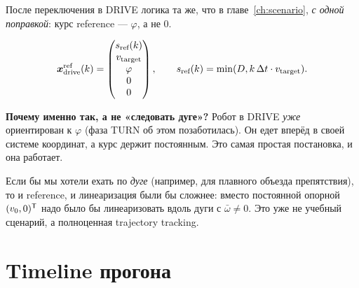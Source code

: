После переключения в DRIVE логика та же, что в главе~\ref{ch:scenario},
\emph{с одной поправкой}: курс reference --- $\varphi$, а не $0$.

\[
  \bm{x}^\text{ref}_\text{drive}(k) =
  \begin{pmatrix} s_\text{ref}(k)\\ v_\text{target}\\ \varphi\\ 0\\ 0 \end{pmatrix},
  \qquad
  s_\text{ref}(k) = \min(D, k\,\Delta t \cdot v_\text{target}).
\]

\begin{ideabox}
\textbf{Почему именно так, а не «следовать дуге»?} Робот в DRIVE
\emph{уже} ориентирован к $\varphi$ (фаза TURN об этом позаботилась).
Он едет вперёд в своей системе координат, а курс держит постоянным.
Это самая простая постановка, и она работает.

Если бы мы хотели ехать по \emph{дуге} (например, для плавного объезда
препятствия), то и reference, и линеаризация были бы сложнее: вместо
постоянной опорной $(v_0, 0)^{\mathsf{T}}$ надо было бы линеаризовать вдоль дуги
с $\bar\omega \ne 0$. Это уже не учебный сценарий, а полноценная
trajectory tracking.
\end{ideabox}

\section{Timeline прогона}

\begin{center}
\end{center}

